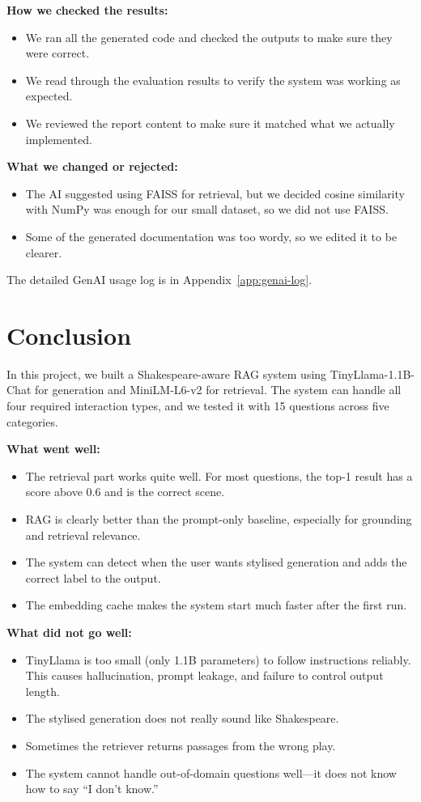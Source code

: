 \documentclass[10pt,conference]{IEEEtran}
\begin{document}
\textbf{How we checked the results:}
\begin{itemize}
    \item We ran all the generated code and checked the outputs to make sure they were correct.
    \item We read through the evaluation results to verify the system was working as expected.
    \item We reviewed the report content to make sure it matched what we actually implemented.
\end{itemize}

\textbf{What we changed or rejected:}
\begin{itemize}
    \item The AI suggested using FAISS for retrieval, but we decided cosine similarity with NumPy was enough for our small dataset, so we did not use FAISS.
    \item Some of the generated documentation was too wordy, so we edited it to be clearer.
\end{itemize}

The detailed GenAI usage log is in Appendix~\ref{app:genai-log}.

\section{Conclusion}
\label{sec:conclusion}

In this project, we built a Shakespeare-aware RAG system using TinyLlama-1.1B-Chat for generation and MiniLM-L6-v2 for retrieval. The system can handle all four required interaction types, and we tested it with 15 questions across five categories.

\textbf{What went well:}
\begin{itemize}
    \item The retrieval part works quite well. For most questions, the top-1 result has a score above 0.6 and is the correct scene.
    \item RAG is clearly better than the prompt-only baseline, especially for grounding and retrieval relevance.
    \item The system can detect when the user wants stylised generation and adds the correct label to the output.
    \item The embedding cache makes the system start much faster after the first run.
\end{itemize}

\textbf{What did not go well:}
\begin{itemize}
    \item TinyLlama is too small (only 1.1B parameters) to follow instructions reliably. This causes hallucination, prompt leakage, and failure to control output length.
    \item The stylised generation does not really sound like Shakespeare.
    \item Sometimes the retriever returns passages from the wrong play.
    \item The system cannot handle out-of-domain questions well---it does not know how to say ``I don't know.''
\end{itemize}
\end{document}
